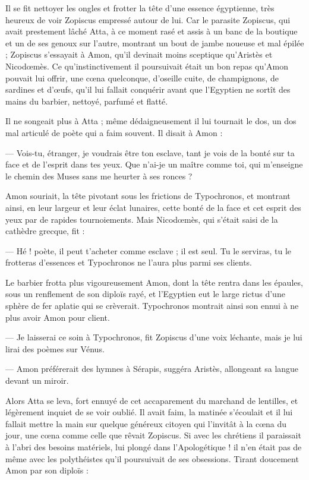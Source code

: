\documentclass[a4paper, 11pt, oneside, polutonikogreek, french]{article}
\begin{document}
Il se fit nettoyer les ongles et frotter la tête d'une essence égyptienne, très heureux de voir Zopiscus empressé autour de lui. Car le parasite Zopiscus, qui avait prestement lâché Atta, à ce moment rasé et assis à un banc de la boutique et un de ses genoux sur l'autre, montrant un bout de jambe noueuse et mal épilée ; Zopiscus s'essayait à Amon, qu'il devinait moins sceptique qu'Aristès et Nicodœmès. Ce qu'instinctivement il poursuivait était un bon repas qu'Amon pouvait lui offrir, une cœna quelconque, d'oseille cuite, de champignons, de sardines et d'œufs, qu'il lui fallait conquérir avant que l'Egyptien ne sortît des mains du barbier, nettoyé, parfumé et flatté.

Il ne songeait plus à Atta ; même dédaigneusement il lui tournait le dos, un dos mal articulé de poète qui a faim souvent. Il disait à Amon :

--- Vois-tu, étranger, je voudrais être ton esclave, tant je vois de la bonté sur ta face et de l'esprit dans tes yeux. Que n'ai-je un maître comme toi, qui m'enseigne le chemin des Muses sans me heurter à ses ronces ?

Amon souriait, la tête pivotant sous les frictions de Typochronos, et montrant ainsi, en leur largeur et leur éclat lunaires, cette bonté de la face et cet esprit des yeux par de rapides tournoiements. Mais Nicodœmès, qui s'était saisi de la cathèdre grecque, fit :

--- Hé ! poète, il peut t'acheter comme esclave ; il est seul. Tu le serviras, tu le frotteras d'essences et Typochronos ne l'aura plus parmi ses clients.

Le barbier frotta plus vigoureusement Amon, dont la tête rentra dans les épaules, sous un renflement de son diploïs rayé, et l'Egyptien eut le large rictus d'une sphère de fer aplatie qui se crèverait. Typochronos montrait ainsi son ennui à ne plus avoir Amon pour client.

--- Je laisserai ce soin à Typochronos, fit Zopiscus d'une voix léchante, mais je lui lirai des poèmes sur Vénus.

--- Amon préférerait des hymnes à Sérapis, suggéra Aristès, allongeant sa langue devant un miroir.

Alors Atta se leva, fort ennuyé de cet accaparement du marchand de lentilles, et légèrement inquiet de se voir oublié. Il avait faim, la matinée s'écoulait et il lui fallait mettre la main sur quelque généreux citoyen qui l'invitât à la cœna du jour, une cœna comme celle que rêvait Zopiscus. Si avec les chrétiens il paraissait à l'abri des besoins matériels, lui plongé dans l'Apologétique ! il n'en était pas de même avec les polythéistes qu'il poursuivait de ses obsessions. Tirant doucement Amon par son diploïs :
\end{document}

